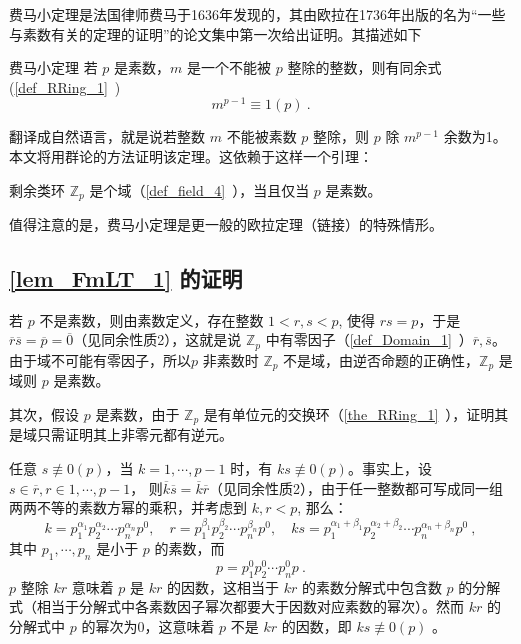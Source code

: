 费马小定理是法国律师费马于1636年发现的，其由欧拉在1736年出版的名为“一些与素数有关的定理的证明”的论文集中第一次给出证明。其描述如下
\begin{theorem}{费马小定理}\label{the_FmLT_1}
若 $p$ 是素数，$m$ 是一个不能被 $p$ 整除的整数，则有同余式(\autoref{def_RRing_1}~)
\begin{equation}\label{eq_FmLT_3}
m^{p-1}\equiv 1(p)~.
\end{equation}
\end{theorem}
翻译成自然语言，就是说若整数 $m$ 不能被素数 $p$ 整除，则 $p$ 除 $m^{p-1}$ 余数为1。本文将用群论的方法证明该定理。这依赖于这样一个引理：
\begin{lemma}{}\label{lem_FmLT_1}
剩余类环 $\mathbb Z_p$ 是个域（\autoref{def_field_4}~），当且仅当 $p$ 是素数。
\end{lemma}

值得注意的是，费马小定理是更一般的欧拉定理（链接）的特殊情形。
\subsection{\autoref{lem_FmLT_1} 的证明}\label{sub_FmLT_1}
若 $p$ 不是素数，则由素数定义，存在整数 $1<r,s<p$, 使得 $rs=p$，于是 $\overline r\overline s=\overline p=\overline 0$（见同余性质2），这就是说 $\mathbb Z_p$ 中有零因子（\autoref{def_Domain_1}~）$\overline r,\overline s$。由于域不可能有零因子，所以$p$ 非素数时 $\mathbb Z_p$ 不是域，由逆否命题的正确性，$\mathbb Z_p$ 是域则 $p$ 是素数。

其次，假设 $p$ 是素数，由于 $\mathbb Z_p$ 是有单位元的交换环（\autoref{the_RRing_1}~），证明其是域只需证明其上非零元都有逆元。

任意 $s\not\equiv 0(p)$，当 $k=1,\cdots,p-1$ 时，有 $ks\not\equiv 0(p)$。事实上，设 $s\in\overline r, r\in{1,\cdots,p-1}$， 则$\overline k\overline s=\overline k\overline r$（见同余性质2），由于任一整数都可写成同一组两两不等的素数方幂的乘积，并考虑到 $k,r<p$, 那么：
\begin{equation}
k=p_1^{\alpha_1}p_2^{\alpha_2}\cdots p_n^{\alpha_n}p^0, \quad r=p_1^{\beta_1}p_2^{\beta_2}\cdots p_n^{\beta_n}p^0,\quad ks=p_1^{\alpha_1+\beta_1}p_2^{\alpha_2+\beta_2}\cdots p_n^{\alpha_n+\beta_n}p^0~,
\end{equation}
其中 $p_1,\cdots,p_n$ 是小于 $p$ 的素数，而
\begin{equation}
p=p_1^0p_2^0\cdots p_n^{0}p~.
\end{equation}
$p$ 整除 $kr$ 意味着 $p$ 是 $kr$ 的因数，这相当于 $kr$ 的素数分解式中包含数 $p$ 的分解式（相当于分解式中各素数因子幂次都要大于因数对应素数的幂次）。然而 $kr$ 的分解式中 $p$ 的幂次为0，这意味着 $p$ 不是 $kr$ 的因数，即 $ks\not\equiv 0(p)$ 。

